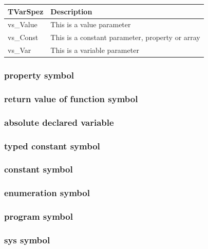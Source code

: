 \documentclass [a4paper,12pt]{article}
\begin{document}
\begin{longtable}{|l|p{10cm}|}
\hline
TVarSpez & Description \\
\hline
\endhead
\hline
\endfoot
\textsf{vs{\_}Value}&
	This is a value parameter \\
\textsf{vs{\_}Const}&
	This is a constant parameter, property or array \\
\textsf{vs{\_}Var}&
	This is a variable parameter
\end{longtable}

\subsubsection{property symbol}
\label{subsubsec:property}

\subsubsection{return value of function symbol}
\label{subsubsec:return}

\subsubsection{absolute declared variable}
\label{subsubsec:absolute}

\subsubsection{typed constant symbol}
\label{subsubsec:typed}

\subsubsection{constant symbol}
\label{subsubsec:constant}

\subsubsection{enumeration symbol}
\label{subsubsec:enumeration}

\subsubsection{program symbol}
\label{subsubsec:program}

\subsubsection{sys symbol}
\label{subsubsec:mylabel4}
\end{document}

